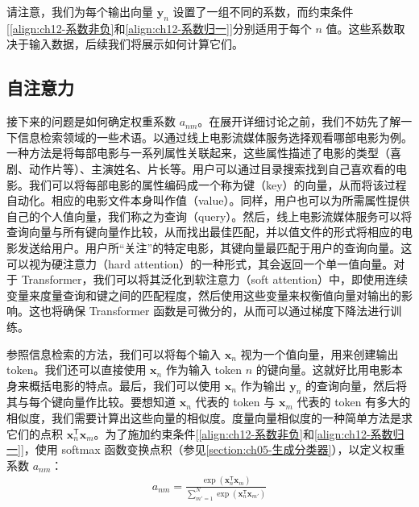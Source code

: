 \documentclass[../../main.tex]{subfiles}
\begin{document}
请注意，我们为每个输出向量 $\mathbf{y}_n$ 设置了一组不同的系数，而约束条件[\eqref{align:ch12-系数非负}和\eqref{align:ch12-系数归一}]分别适用于每个 $n$ 值。这些系数取决于输入数据，后续我们将展示如何计算它们。

\subsection{自注意力}\label{subsection:ch12-自注意力}

接下来的问题是如何确定权重系数 $a_{nm}$。在展开详细讨论之前，我们不妨先了解一下信息检索领域的一些术语。以通过线上电影流媒体服务选择观看哪部电影为例。一种方法是将每部电影与一系列属性关联起来，这些属性描述了电影的类型（喜剧、动作片等）、主演姓名、片长等。用户可以通过目录搜索找到自己喜欢看的电影。我们可以将每部电影的属性编码成一个称为键（key）的向量，从而将该过程自动化。相应的电影文件本身叫作值（value）。同样，用户也可以为所需属性提供自己的个人值向量，我们称之为查询（query）。然后，线上电影流媒体服务可以将查询向量与所有键向量作比较，从而找出最佳匹配，并以值文件的形式将相应的电影发送给用户。用户所“关注”的特定电影，其键向量最匹配于用户的查询向量。这可以视为硬注意力（hard attention）的一种形式，其会返回一个单一值向量。对于 Transformer，我们可以将其泛化到软注意力（soft attention）中，即使用连续变量来度量查询和键之间的匹配程度，然后使用这些变量来权衡值向量对输出的影响。这也将确保 Transformer 函数是可微分的，从而可以通过梯度下降法进行训练。

参照信息检索的方法，我们可以将每个输入 $\mathbf{x}_n$ 视为一个值向量，用来创建输出 token。我们还可以直接使用 $\mathbf{x}_n$ 作为输入 token $n$ 的键向量。这就好比用电影本身来概括电影的特点。最后，我们可以使用 $\mathbf{x}_n$ 作为输出 $\mathbf{y}_n$ 的查询向量，然后将其与每个键向量作比较。要想知道 $\mathbf{x}_n$ 代表的 token 与 $\mathbf{x}_m$ 代表的 token 有多大的相似度，我们需要计算出这些向量的相似度。度量向量相似度的一种简单方法是求它们的点积 $\mathbf{x}_n^{\mathsf{T}}\mathbf{x}_m$。为了施加约束条件[\eqref{align:ch12-系数非负}和\eqref{align:ch12-系数归一}]，使用 softmax 函数变换点积（参见\cref{section:ch05-生成分类器}），以定义权重系数 $a_{nm}$：
\begin{align}
a_{nm}=\frac{\exp\left(\mathbf{x}_n^{\mathsf{T}}\mathbf{x}_m\right)}{\sum_{m'=1}^{N}\exp\left(\mathbf{x}_n^{\mathsf{T}}\mathbf{x}_{m'}\right)}
\label{align:ch12-点积注意力系数}
\end{align}
\end{document}

